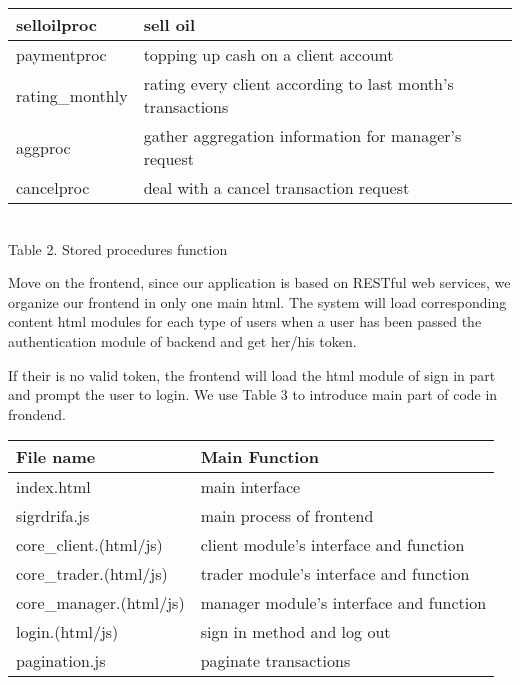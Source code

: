 \documentclass[12pt,a4paper]{report}
\begin{document}
\begin{mypara}
\begin{center}
\begin{tabular}{|l|l|}
      selloilproc & sell oil\\
      \hline
      paymentproc & topping up cash on a client account\\
      \hline
      rating\_monthly & rating every client according to last month's transactions\\
      \hline
      aggproc & gather aggregation information for manager's request\\
      \hline
      cancelproc & deal with a cancel transaction request\\
      \hline
    \end{tabular}\\
    \vspace{0.2cm}
    Table 2. Stored procedures function
  \end{center}
  \par
  Move on the frontend, since our application is based on RESTful web services, we organize our frontend in only one main html. The system will load corresponding content html modules for each type of users when a user has been passed the authentication module of backend and get her/his token.
  \par
  If their is no valid token, the frontend will load the html module of sign in part and prompt the user to login. We use Table 3 to introduce main part of code in frondend.
  \par\noindent\ignorespaces
  \begin{center}
    \begin{tabular}{|l|l|}
      \hline
      \textbf{File name} & \textbf{Main Function}\\
      \hline
      index.html & main interface\\
      \hline
      sigrdrifa.js & main process of frontend\\
      \hline
      core\_client.(html/js) & client module's interface and function\\
      \hline
      core\_trader.(html/js) & trader module's interface and function\\
      \hline
      core\_manager.(html/js) & manager module's interface and function\\
      \hline
      login.(html/js) & sign in method and log out\\
      \hline
      pagination.js & paginate transactions\\
      \hline
    \end{tabular}\\
    \vspace{0.2cm}

\end{center}
\end{mypara}
\end{document}
